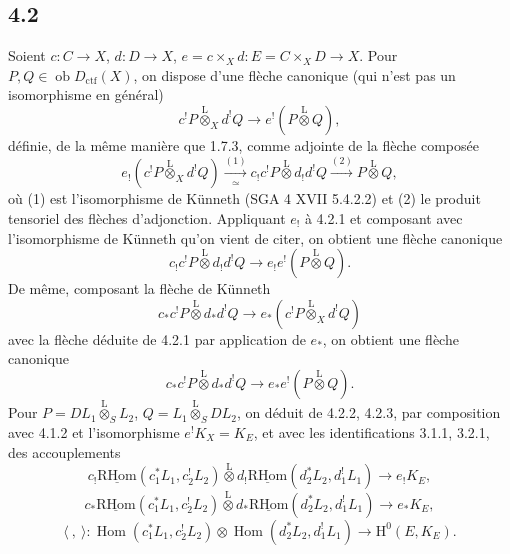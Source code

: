 \documentclass[11pt]{article}
\renewcommand{\H}{\mathrm{H}}
\DeclareMathOperator{\Hom}{Hom}
\newcommand{\R}{\mathrm{R}}\newcommand{\RHomCore}{\mathrm{RHom}}
\newcommand{\ob}{\operatorname{ob}}
\providecommand{\RHom}{\RHomCore}
\providecommand{\uRHom}{\underline{\RHom}}
\providecommand{\Dctf}{D_{\mathrm{ctf}}}
\providecommand{\Dctf}{D_{\mathrm{ctf}}}
\providecommand{\RHom}{\RHomCore}
\providecommand{\Hom}{\operatorname{Hom}}
\providecommand{\ob}{\operatorname{ob}}
\providecommand{\RHom}{\R\mathcal{H}om}
\providecommand{\R}{\mathrm R}
\providecommand{\RHom}{\RHomCore}
\providecommand{\Hom}{\operatorname{Hom}}
\begin{document}
\subsection*{4.2}
Soient $c:C\to X$, $d:D\to X$, $e=c\times_Xd:E=C\times_XD\to X$. Pour $P,Q\in\ob\Dctf(X)$, on dispose d'une flèche canonique (qui n'est pas un isomorphisme en général)
\begin{equation}
c^!P\overset{\mathrm{L}}{\otimes}_X d^!Q
\longrightarrow e^!(P\overset{\mathrm{L}}{\otimes}Q),
\tag{4.2.1}
\end{equation}
définie, de la
même manière que 1.7.3, comme adjointe de la flèche composée
\[
e_!(c^!P\overset{\mathrm{L}}{\otimes}_X d^!Q)
\xrightarrow[\simeq]{(1)}
 c_!c^!P\overset{\mathrm{L}}{\otimes}d_!d^!Q
\xrightarrow{(2)} P\overset{\mathrm{L}}{\otimes}Q,
\]
où (1) est l'isomorphisme de Künneth (SGA 4 XVII 5.4.2.2) et (2) le produit tensoriel des flèches d'adjonction. Appliquant $e_!$ à 4.2.1 et composant avec l'isomorphisme de Künneth qu'on vient de citer, on obtient une flèche canonique
\begin{equation}
c_!c^!P\overset{\mathrm{L}}{\otimes}d_!d^!Q
\longrightarrow e_!e^!(P\overset{\mathrm{L}}{\otimes}Q).
\tag{4.2.2}
\end{equation}
De même, composant la flèche de Künneth
\[
c_*c^!P\overset{\mathrm{L}}{\otimes}d_*d^!Q
\longrightarrow e_*(c^!P\overset{\mathrm{L}}{\otimes}_X d^!Q)
\]
avec la flèche déduite de 4.2.1 par application de $e_*$, on obtient une flèche canonique
\begin{equation}
c_*c^!P\overset{\mathrm{L}}{\otimes}d_*d^!Q
\longrightarrow e_*e^!(P\overset{\mathrm{L}}{\otimes}Q).
\tag{4.2.3}
\end{equation}
Pour $P=DL_1\overset{\mathrm{L}}{\otimes}_S L_2$, $Q=L_1\overset{\mathrm{L}}{\otimes}_S DL_2$, on déduit de 4.2.2, 4.2.3, par composition avec 4.1.2 et l'isomorphisme $e^!K_X=K_E$, et avec les identifications 3.1.1, 3.2.1, des accouplements
\begin{equation}
c_!\uRHom(c_1^*L_1,c_2^!L_2)\overset{\mathrm{L}}{\otimes}
 d_!\uRHom(d_2^*L_2,d_1^!L_1)
\longrightarrow e_!K_E,
\tag{4.2.4}
\end{equation}
\begin{equation}
c_*\uRHom(c_1^*L_1,c_2^!L_2)\overset{\mathrm{L}}{\otimes}
 d_*\uRHom(d_2^*L_2,d_1^!L_1)
\longrightarrow e_*K_E,
\tag*{(4.2.4)'}
\end{equation}
\begin{equation}
\langle\ ,\ \rangle:
\Hom(c_1^*L_1,c_2^!L_2)\otimes\Hom(d_2^*L_2,d_1^!L_1)
\longrightarrow \H^0(E,K_E).
\tag{4.2.5}
\end{equation}
\end{document}
